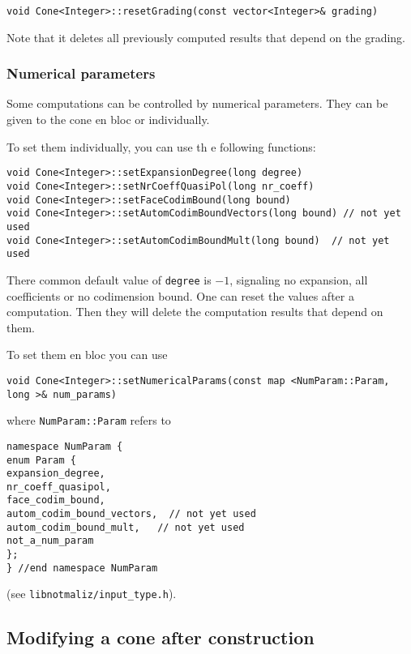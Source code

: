 \documentclass[12pt,a4paper]{scrartcl}
\theoremstyle{definition}
\begin{document}
\begin{small}
\begin{Verbatim}
void Cone<Integer>::resetGrading(const vector<Integer>& grading)
\end{Verbatim}

Note that it deletes all previously computed results that depend on the grading.


\subsubsection{Numerical parameters}

Some computations can be controlled by numerical parameters. They can be given to the cone en bloc or individually.

To set them individually, you can use th e following functions:
\begin{Verbatim}
void Cone<Integer>::setExpansionDegree(long degree)
void Cone<Integer>::setNrCoeffQuasiPol(long nr_coeff)
void Cone<Integer>::setFaceCodimBound(long bound)
void Cone<Integer>::setAutomCodimBoundVectors(long bound) // not yet used
void Cone<Integer>::setAutomCodimBoundMult(long bound)  // not yet used
\end{Verbatim}
There common default value of \verb|degree| is $-1$, signaling no expansion, all coefficients or no codimension bound. One can reset the values after a computation. Then they will delete the computation results that depend on them. 

To set them en bloc you can use
\begin{Verbatim}
void Cone<Integer>::setNumericalParams(const map <NumParam::Param, long >& num_params)
\end{Verbatim}
where \verb|NumParam::Param| refers to
\begin{Verbatim}
namespace NumParam {
enum Param {    
expansion_degree,
nr_coeff_quasipol,
face_codim_bound,
autom_codim_bound_vectors,  // not yet used
autom_codim_bound_mult,   // not yet used
not_a_num_param
};
} //end namespace NumParam
\end{Verbatim}
(see \verb|libnotmaliz/input_type.h|).

\subsection{Modifying a cone after construction}\label{Modify}


\end{small}
\end{document}
